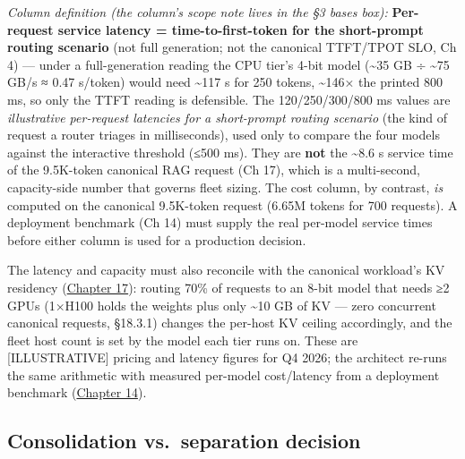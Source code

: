 \emph{Column definition (the column's scope note lives in the §3 bases
box):} \textbf{Per-request service latency = time-to-first-token for the
short-prompt routing scenario} (not full generation; not the canonical
TTFT/TPOT SLO, Ch 4) --- under a full-generation reading the CPU tier's
4-bit model (\textasciitilde35 GB ÷ \textasciitilde75 GB/s ≈ 0.47
s/token) would need \textasciitilde117 s for 250 tokens,
\textasciitilde146× the printed 800 ms, so only the TTFT reading is
defensible. The 120/250/300/800 ms values are \emph{illustrative
per-request latencies for a short-prompt routing scenario} (the kind of
request a router triages in milliseconds), used only to compare the four
models against the interactive threshold (≤500 ms). They are
\textbf{not} the \textasciitilde8.6 s service time of the 9.5K-token
canonical RAG request (Ch 17), which is a multi-second, capacity-side
number that governs fleet sizing. The cost column, by contrast,
\emph{is} computed on the canonical 9.5K-token request (6.65M tokens for
700 requests). A deployment benchmark (Ch 14) must supply the real
per-model service times before either column is used for a production
decision.

The latency and capacity must also reconcile with the canonical
workload's KV residency (\hyperref[chap:17]{Chapter 17}): routing 70\% of requests to an
8-bit model that needs ≥2 GPUs (1×H100 holds the weights plus only
\textasciitilde10 GB of KV --- zero concurrent canonical requests,
§18.3.1) changes the per-host KV ceiling accordingly, and the fleet host
count is set by the model each tier runs on. These are
\mbox{{[}ILLUSTRATIVE{]}} pricing and latency figures for Q4 2026; the
architect re-runs the same arithmetic with measured per-model
cost/latency from a deployment benchmark (\hyperref[chap:14]{Chapter 14}).

\subsection{Consolidation vs.~separation
decision}\label{consolidation-vs.-separation-decision}


